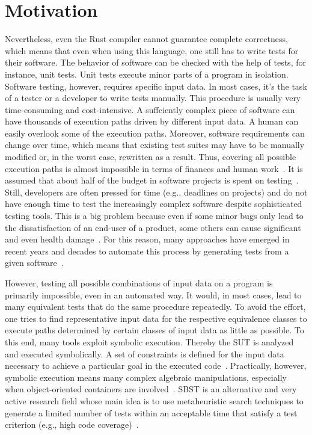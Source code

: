 \documentclass[paper=a4,%
  twoside,%
  BCOR4mm,%
  abstract=true,%
  toc=bibliography,%
  chapterprefix=true,%
  toc=bibliographynumbered,%
  open=right,%
  english,%
  pagesize=pdftex]{scrreprt}
\begin{document}
\section{Motivation}
Nevertheless, even the Rust compiler cannot guarantee complete correctness, which means that even when using this language, one still has to write tests for their software. The behavior of software can be checked with the help of tests, for instance, unit tests. Unit tests execute minor parts of a program in isolation. Software testing, however, requires specific input data. In most cases, it's the task of a tester or a developer to write tests manually. This procedure is usually very time-consuming and cost-intensive. A suffciently complex piece of software can have thousands of execution paths driven by different input data. A human can easily overlook some of the execution paths. Moreover, software requirements can change over time, which means that existing test suites may have to be manually modified or, in the worst case, rewritten as a result. Thus, covering all possible execution paths is almost impossible in terms of finances and human work~\cite{Myers2012}. It is assumed that about half of the budget in software projects is spent on testing~\cite{Beizer2003}. Still, developers are often pressed for time (e.g., deadlines on projects) and do not have enough time to test the increasingly complex software despite sophisticated testing tools. This is a big problem because even if some minor bugs only lead to the dissatisfaction of an end-user of a product, some others can cause significant and even health damage~\cite{Myers2012}. For this reason, many approaches have emerged in recent years and decades to automate this process by generating tests from a given software~\cite{McMinn_2004}.

However, testing all possible combinations of input data on a program is primarily impossible, even in an automated way. It would, in most cases, lead to many equivalent tests that do the same procedure repeatedly. To avoid the effort, one tries to find representative input data for the respective equivalence classes to execute paths determined by certain classes of input data as little as possible. To this end, many tools exploit symbolic execution. Thereby the \ac{SUT} is analyzed and executed symbolically. A set of constraints is defined for the input data necessary to achieve a particular goal in the executed code~\cite{Clarke1976}. Practically, however, symbolic execution means many complex algebraic manipulations, especially when object-oriented containers are involved~\cite{Korel1990}. \ac{SBST} is an alternative and very active research field whose main idea is to use metaheuristic search techniques to generate a limited number of tests within an acceptable time that satisfy a test criterion (e.g., high code coverage)~\cite{McMinn_2004}.
\end{document}
